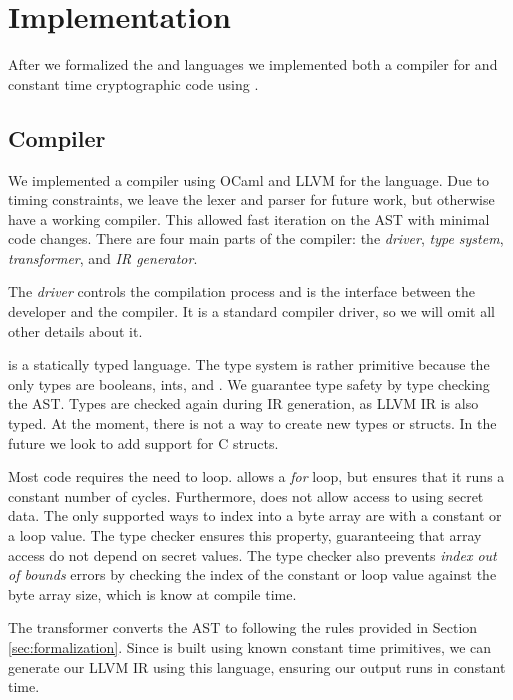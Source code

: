 \section{Implementation}
\label{sec:implementation}

After we formalized the \constc and \ccore languages we implemented both a compiler for \constc and constant time cryptographic code using \constc.

\subsection{\constc Compiler}
We implemented a compiler using OCaml and LLVM for the \constc language. Due to timing constraints, we leave the lexer and parser for future work, but otherwise have a working compiler. This allowed fast iteration on the AST with minimal code changes. There are four main parts of the \constc compiler: the \textit{driver}, \textit{type system}, \textit{transformer}, and \textit{IR generator}.

 The \textit{driver} controls the compilation process and is the interface between the developer and the compiler. It is a standard compiler driver, so we will omit all other details about it.

 \constc is a statically typed language. The type system is rather primitive because the only types are booleans, ints, and \bytearrays. We guarantee type safety by type checking the \constc AST. Types are checked again during IR generation, as LLVM IR is also typed. At the moment, there is not a way to create new types or structs. In the future we look to add support for C structs.

Most code requires the need to loop. \constc allows a \textit{for} loop, but ensures that it runs a constant number of cycles. Furthermore, \constc does not allow access to \bytearrays using secret data. The only supported ways to index into a byte array are with a constant or a loop value. The type checker ensures this property, guaranteeing that array access do not depend on secret values. The type checker also prevents \textit{index out of bounds} errors by checking the index of the constant or loop value against the byte array size, which is know at compile time.

 The transformer converts the \constc AST to \ccore following the rules provided in Section \ref{sec:formalization}. Since \ccore is built using known constant time primitives, we can generate our LLVM IR using this language, ensuring our output runs in constant time.


